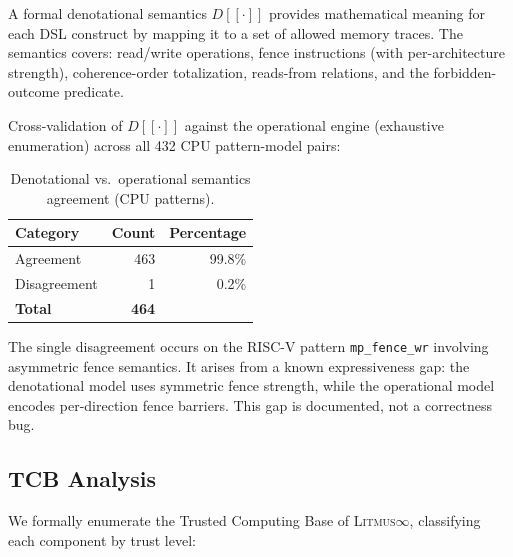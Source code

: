 \documentclass[11pt]{article}
\newcommand{\litmus}{\textsc{Litmus$\infty$}}
\begin{document}
A formal denotational semantics $D[\![\cdot]\!]$ provides mathematical
meaning for each DSL construct by mapping it to a set of allowed
memory traces.  The semantics covers: read/write operations,
fence instructions (with per-architecture strength),
coherence-order totalization, reads-from relations, and
the forbidden-outcome predicate.

Cross-validation of $D[\![\cdot]\!]$ against the operational
engine (exhaustive enumeration) across all 432 CPU pattern-model pairs:

\begin{table}[ht]
\centering
\caption{Denotational vs.\ operational semantics agreement (CPU patterns).}
\label{tab:denotational-validation}
\small
\begin{tabular}{lrr}
\toprule
\textbf{Category} & \textbf{Count} & \textbf{Percentage} \\
\midrule
Agreement          & 463   & 99.8\% \\
Disagreement       & 1     & 0.2\% \\
\midrule
\textbf{Total}     & \textbf{464} & \\
\bottomrule
\end{tabular}
\end{table}

\noindent
The single disagreement occurs on the RISC-V pattern \texttt{mp\_fence\_wr}
involving asymmetric fence semantics.
It arises from a known expressiveness gap: the denotational model
uses symmetric fence strength, while the operational model
encodes per-direction fence barriers.  This gap is documented,
not a correctness bug.

\subsection{TCB Analysis}
\label{sec:tcb-analysis}

We formally enumerate the Trusted Computing Base of \litmus{},
classifying each component by trust level:
\end{document}
